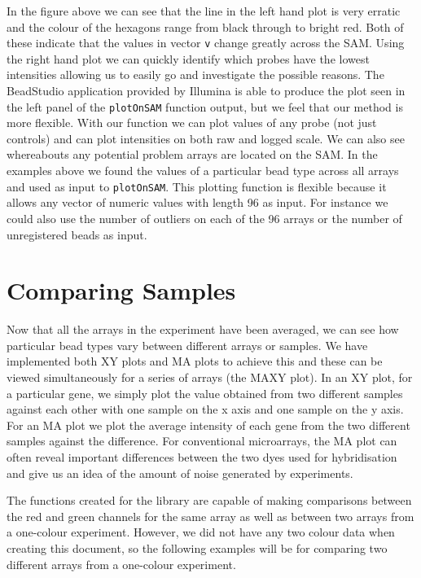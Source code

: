 \documentclass[a4paper]{article}
\newcommand{\Robject}[1]{{\texttt{#1}}}
\newcommand{\Rfunction}[1]{{\texttt{#1}}}
\begin{document}
In the figure above we can see that the line in the left hand plot is very erratic and the colour of the hexagons range from black through to bright red.  Both of these indicate that the values in vector \Robject{v} change greatly across the SAM.  Using the right hand plot we can quickly identify which probes have the lowest intensities allowing us to easily go and investigate the possible reasons. The BeadStudio application provided by Illumina is able to produce the plot seen in the left panel of the \Rfunction{plotOnSAM} function output, but we feel that our method is more flexible. With our function we can plot values of any 
probe (not just controls) and can plot intensities on both raw and logged scale. We can also see whereabouts any potential problem arrays are located on the SAM. In the examples above we found the values of a particular bead type across all arrays and used as input to \Rfunction{plotOnSAM}. This plotting function is flexible because it allows any vector of numeric values with length 96 as input. For instance we could also use the number of outliers on each of the 96 arrays or the number of unregistered beads as input. 


\section{Comparing Samples}
\label{comparing_samples}

Now that all the arrays in the experiment have been averaged, we can
see how particular bead types vary between different arrays or
samples. We have implemented both XY plots and MA plots to achieve
this and these can be viewed simultaneously for a series of arrays
(the MAXY plot).
In an XY plot, for a particular gene, we simply plot the value obtained from two different samples against each other with one sample on the x axis and one sample on the y axis. For an MA plot we plot the average intensity 
of each gene from the two different samples against the difference. For conventional microarrays, the MA plot can often reveal important differences between the two dyes used for hybridisation and give us an idea of the 
amount of noise generated by experiments. 

The functions created for the library are capable of making comparisons between the red and green channels for the same array as well as between two arrays from a one-colour experiment. However, we did not have any two 
colour data when creating this document, so the following examples will be for comparing two different arrays from a one-colour experiment.
\end{document}
